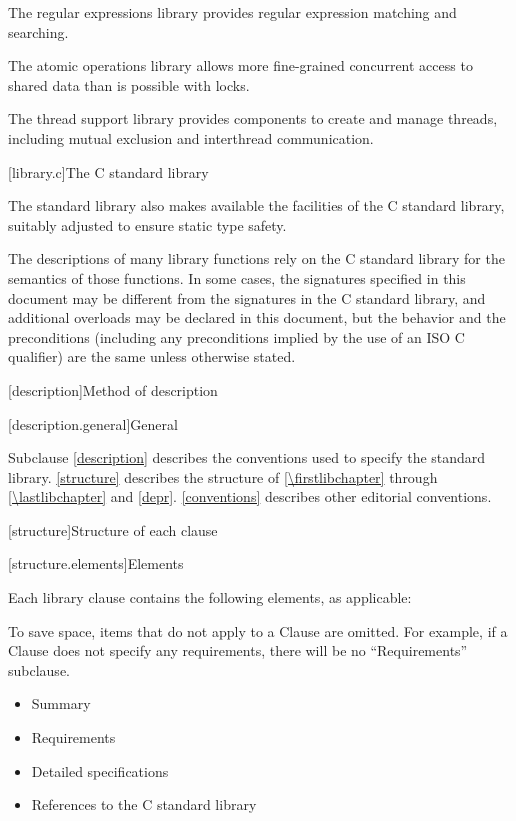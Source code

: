 \pnum
The regular expressions library provides regular expression matching and searching.

\pnum
The atomic operations library allows more fine-grained
concurrent access to shared data than is possible with locks.

\pnum
The thread support library provides components to create
and manage threads, including mutual exclusion and interthread communication.

[library.c]{The C standard library}

\pnum
The \Cpp{} standard library also makes available the facilities of the C standard library,
%
suitably adjusted to ensure static type safety.

\pnum
The descriptions of many library functions rely on the C standard library for
the semantics of those functions.
In some cases,
the signatures specified in this document
may be different from the signatures in the C standard library,
and additional overloads may be declared in this document,
but the behavior and the preconditions
(including any preconditions implied by the use of an
ISO C  qualifier)
are the same unless otherwise stated.

[description]{Method of description}

[description.general]{General}

\pnum
Subclause \ref{description} describes the conventions used to specify the \Cpp{} standard
library. \ref{structure} describes the structure of
\ref{\firstlibchapter} through \ref{\lastlibchapter} and
\ref{depr}. \ref{conventions} describes other editorial conventions.

[structure]{Structure of each clause}

[structure.elements]{Elements}

\pnum
Each library clause contains the following elements, as applicable:
\begin{footnote}
To
save space, items that do not apply to a Clause are omitted.
For example, if a Clause does not specify any requirements,
there will be no ``Requirements'' subclause.
\end{footnote}

\begin{itemize}
\item Summary
\item Requirements
\item Detailed specifications
\item References to the C standard library
\end{itemize}

